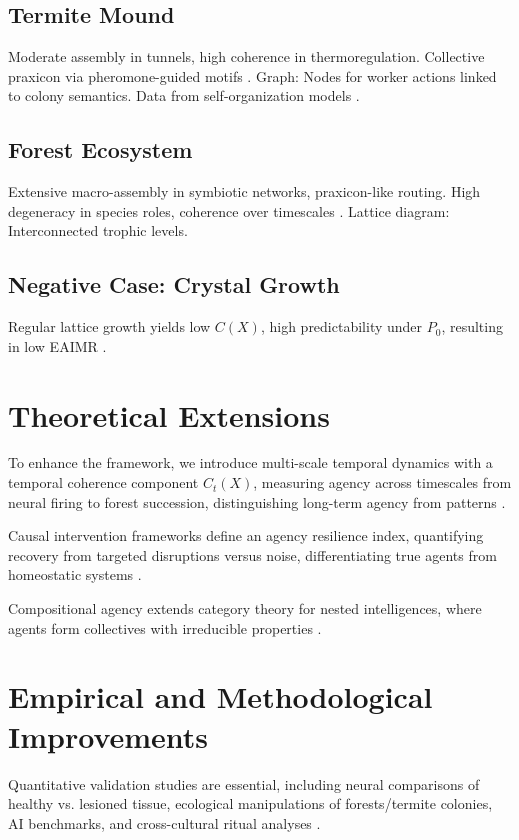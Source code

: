 \documentclass{article}
\begin{document}
\subsection{Termite Mound}
Moderate assembly in tunnels, high coherence in thermoregulation. Collective praxicon via pheromone-guided motifs \citep{turner2000}. Graph: Nodes for worker actions linked to colony semantics. Data from self-organization models \citep{camazine2001}.

\subsection{Forest Ecosystem}
Extensive macro-assembly in symbiotic networks, praxicon-like routing. High degeneracy in species roles, coherence over timescales \citep{levin2019}. Lattice diagram: Interconnected trophic levels.

\subsection{Negative Case: Crystal Growth}
Regular lattice growth yields low $C(X)$, high predictability under $P_0$, resulting in low EAIMR \citep{hazen2007}.

\section{Theoretical Extensions}
\label{sec:theoretical_extensions}

To enhance the framework, we introduce multi-scale temporal dynamics with a temporal coherence component $C_t(X)$, measuring agency across timescales from neural firing to forest succession, distinguishing long-term agency from patterns \citep{levin2019}.

Causal intervention frameworks define an agency resilience index, quantifying recovery from targeted disruptions versus noise, differentiating true agents from homeostatic systems \citep{barandiaran2009}.

Compositional agency extends category theory for nested intelligences, where agents form collectives with irreducible properties \citep{ehresmann2021}.

\section{Empirical and Methodological Improvements}
\label{sec:empirical}

Quantitative validation studies are essential, including neural comparisons of healthy vs. lesioned tissue, ecological manipulations of forests/termite colonies, AI benchmarks, and cross-cultural ritual analyses \citep{pastra2011}.
\end{document}
